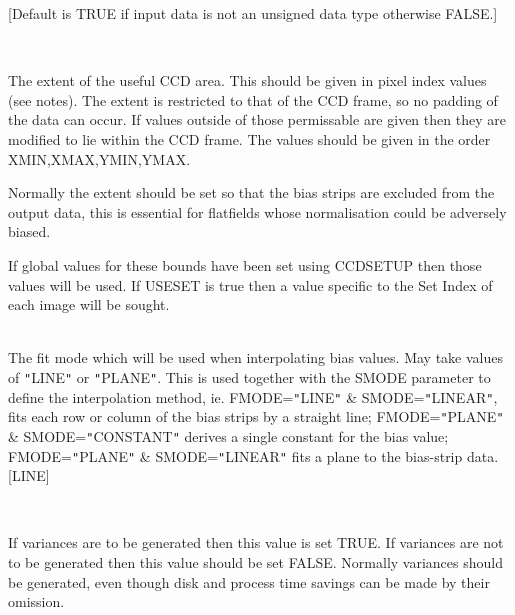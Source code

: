 \documentclass[twoside,11pt]{article}
\renewcommand{\_}{\texttt{\symbol{95}}}
\newcommand{\qt}[1]{{\tt "}#1{\tt "}}
\newcommand{\routine}[1]{{\sc #1}}
\newcommand{\sstsubsection}[1]{ \item[{#1}] \mbox{} \\}
\newcommand{\sstsubsection}[1]{\item[{#1}]}
\begin{document}
{{{         [Default is TRUE if input data is not an unsigned data type
         otherwise FALSE.]
      }
      \sstsubsection{
         EXTENT(4) = \_INTEGER (Read)
      } {
         The extent of the useful CCD area. This should be given in
         pixel index values (see notes). The extent is restricted to
         that of the CCD frame, so no padding of the data can occur. If
         values outside of those permissable are given then they are
         modified to lie within the CCD frame. The values should be
         given in the order XMIN,XMAX,YMIN,YMAX.

         Normally the extent should be set so that the bias strips
         are excluded from the output data, this is essential for
         flatfields whose normalisation could be adversely biased.

         If global values for these bounds have been set using
         \routine{CCDSETUP} then those values will be used.  If USESET is true then a
         value specific to the Set Index of each image will be sought.
      }
      \sstsubsection{
         FMODE = LITERAL (Read)
      } {
         The fit mode which will be used when interpolating bias values.
         May take values of \qt{LINE} or \qt{PLANE}. This is used together
         with the SMODE parameter to define the interpolation method,
         ie. FMODE=\qt{LINE} \& SMODE=\qt{LINEAR}, fits each row or column of
         the bias strips by a straight line; FMODE=\qt{PLANE} \&
         SMODE=\qt{CONSTANT} derives a single constant for the bias value; \\
         FMODE=\qt{PLANE} \& SMODE=\qt{LINEAR} fits a plane to the bias-strip
         data.
         [LINE]
      }
      \sstsubsection{
         GENVAR = \_LOGICAL (Read)
      } {
         If variances are to be generated then this value is set
         TRUE. If variances are not to be generated then this value
         should be set FALSE. Normally variances should be generated,
         even though disk and process time savings can be made by their
         omission.

}}}
\end{document}
